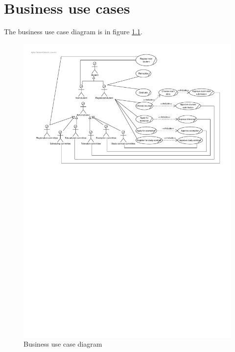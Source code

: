 \chapter{Business use cases}
\label{business-uc}

\par The business use case diagram is in figure \ref{fig:business-use-case-diagram}.

\begin{figure}[H]
	\begin{centering}
		\includegraphics[width=\textwidth]{figs/business-use-case-diagram.pdf}
		\caption{Business use case diagram}
		\label{fig:business-use-case-diagram}
	\end{centering}
\end{figure}













